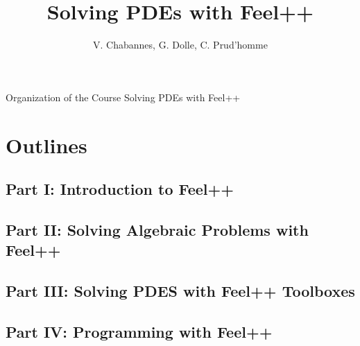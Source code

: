 

\title[Feel++]{Solving PDEs with Feel++}
\subtitle[]{}

\author[]{V. Chabannes, G. Dolle, C. Prud'homme}


\date[January 25, 2017]{}

\begin{frame}
\titlepage
\end{frame}
\begin{frame}{Organization of the Course Solving PDEs with Feel++}
\tableofcontents
\end{frame}

\section*{Outlines}
\subsection{Part I: Introduction to Feel++}
\subsection{Part II: Solving Algebraic Problems with Feel++}
\subsection{Part III: Solving PDES with Feel++ Toolboxes}
\subsection{Part IV: Programming with Feel++}



